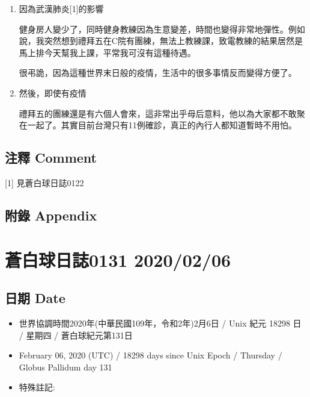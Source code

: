 \documentclass[
]{article}
\providecommand{\tightlist}{%
  \setlength{\itemsep}{0pt}\setlength{\parskip}{0pt}}
\begin{document}
\begin{enumerate}
\def\labelenumi{\arabic{enumi}.}
\item
  因為武漢肺炎{[}1{]}的影響

  健身房人變少了，同時健身教練因為生意變差，時間也變得非常地彈性。例如說，我突然想到禮拜五在C院有團練，無法上教練課，致電教練的結果居然是馬上排今天幫我上課，平常我可沒有這種待遇。

  很弔詭，因為這種世界末日般的疫情，生活中的很多事情反而變得方便了。
\item
  然後，即使有疫情

  禮拜五的團練還是有六個人會來，這非常出乎母后意料，他以為大家都不敢聚在一起了。其實目前台灣只有11例確診，真正的內行人都知道暫時不用怕。
\end{enumerate}

\hypertarget{ux6ce8ux91cb-comment-4}{%
\subsection{注釋 Comment}\label{ux6ce8ux91cb-comment-4}}

{[}1{]} 見蒼白球日誌0122

\hypertarget{ux9644ux9304-appendix-4}{%
\subsection{附錄 Appendix}\label{ux9644ux9304-appendix-4}}

\hypertarget{ux84bcux767dux7403ux65e5ux8a8c0131-20200206}{%
\section{蒼白球日誌0131
2020/02/06}\label{ux84bcux767dux7403ux65e5ux8a8c0131-20200206}}

\hypertarget{ux65e5ux671f-date-5}{%
\subsection{日期 Date}\label{ux65e5ux671f-date-5}}

\begin{itemize}
\tightlist
\item
  世界協調時間2020年(中華民國109年，令和2年)2月6日 / Unix 紀元 18298 日
  / 星期四 / 蒼白球紀元第131日
\item
  February 06, 2020 (UTC) / 18298 days since Unix Epoch / Thursday /
  Globus Pallidum day 131
\item
  特殊註記:
\end{itemize}
\end{document}
